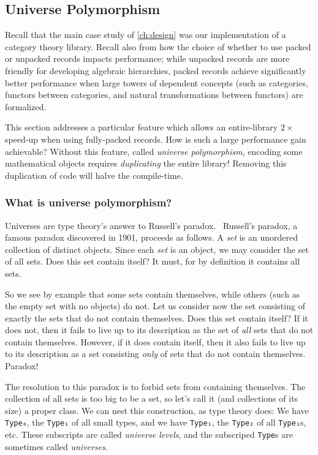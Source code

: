 \subsection{Universe Polymorphism}\label{sec:fixes:theory:univ-poly}\label{sec:univ-poly}

Recall that the main case study of \autoref{ch:design} was our implementation of a category theory library.
Recall also from  how the choice of whether to use packed or unpacked records impacts performance; while unpacked records are more friendly for developing algebraic hierarchies, packed records achieve significantly better performance when large towers of dependent concepts (such as categories, functors between categories, and natural transformations between functors) are formalized.

This section addresses a particular feature which allows an entire-library $2\times$ speed-up when using fully-packed records.
How is such a large performance gain achievable?
Without this feature, called \emph{universe polymorphism}, encoding some mathematical objects requires \emph{duplicating} the entire library!
Removing this duplication of code will halve the compile-time.

\subsubsection{What is universe polymorphism?}\label{sec:universe-polymorphism-def}
Universes are type theory's answer to Russell's paradox.~\cite{sep-russell-paradox}
Russell's paradox, a famous paradox discovered in 1901, proceeds as follows.
A \emph{set} is an unordered collection of distinct objects.
Since each \emph{set} is an object, we may consider the set of all sets.
Does this set contain itself?
It must, for by definition it contains all sets.

So we see by example that some sets contain themselves, while others (such as the empty set with no objects) do not.
Let us consider now the set consisting of exactly the sets that do not contain themselves.
Does this set contain itself?
If it does not, then it fails to live up to its description as the set of \emph{all} sets that do not contain themselves.
However, if it does contain itself, then it also fails to live up to its description as a set consisting \emph{only} of sets that do not contain themselves.
Paradox!

The resolution to this paradox is to forbid sets from containing themselves.
The collection of all sets is too big to be a set, so let's call it (and collections of its size) a proper class.
We can nest this construction, as type theory does:
We have \texttt{Type₀}, the \texttt{Type₁} of all small types, and we have \texttt{Type₁}, the \texttt{Type₂} of all \texttt{Type₁}s, etc.
These subscripts are called \emph{universe levels}, and the subscriped \texttt{Type}s are sometimes called \emph{universes}.

